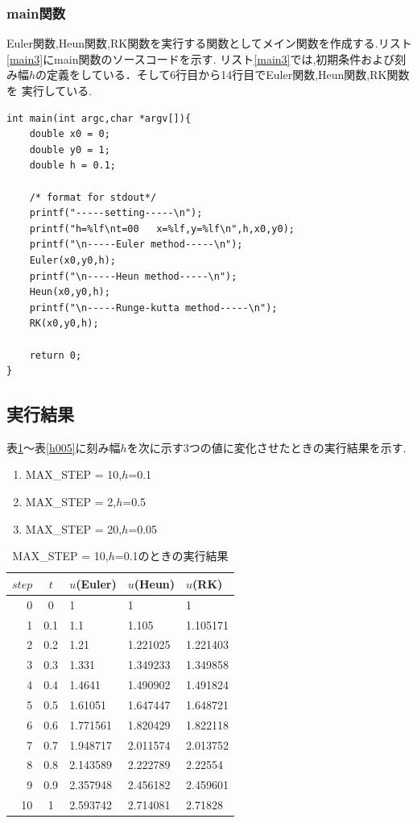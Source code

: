 \documentclass[dvipdfmx]{jarticle}
\begin{document}
      \subsubsection{main関数}
      Euler関数,Heun関数,RK関数を実行する関数としてメイン関数を作成する.リスト\ref{main3}にmain関数のソースコードを示す.
      リスト\ref{main3}では,初期条件および刻み幅$h$の定義をしている．そして6行目から14行目でEuler関数,Heun関数,RK関数を
      実行している.
      \begin{lstlisting}[basicstyle=\ttfamily\footnotesize, frame=single,label=main3,caption=main関数]
int main(int argc,char *argv[]){
    double x0 = 0;
    double y0 = 1;
    double h = 0.1;

    /* format for stdout*/
    printf("-----setting-----\n");
    printf("h=%lf\nt=00   x=%lf,y=%lf\n",h,x0,y0);
    printf("\n-----Euler method-----\n");
    Euler(x0,y0,h);
    printf("\n-----Heun method-----\n");
    Heun(x0,y0,h);
    printf("\n-----Runge-kutta method-----\n");
    RK(x0,y0,h);
    
    return 0;
}
            \end{lstlisting}      

    \subsection{実行結果}
    表\ref{h01}～表\ref{h005}に刻み幅$h$を次に示す3つの値に変化させたときの実行結果を示す.
    \begin{enumerate}
      \item MAX\_STEP = 10,$h$=0.1
      \item MAX\_STEP = 2,$h$=0.5
      \item MAX\_STEP = 20,$h$=0.05
    \end{enumerate}

    \begin{table}[H]
      \caption{MAX\_STEP = 10,$h$=0.1のときの実行結果}
    \label{h01}
    \begin{center}
        \begin{tabular}{r|c|l|l|l}\hline
          $step$ & $t$ & $u$(Euler) & $u$(Heun) & $u$(RK) \\ \hline \hline
0 & 0 & 1 & 1 & 1 \\ 
1 & 0.1 & 1.1 & 1.105 & 1.105171 \\ 
2 & 0.2 & 1.21 & 1.221025 & 1.221403 \\ 
3 & 0.3 & 1.331 & 1.349233 & 1.349858 \\ 
4 & 0.4 & 1.4641 & 1.490902 & 1.491824 \\ 
5 & 0.5 & 1.61051 & 1.647447 & 1.648721 \\ 
6 & 0.6 & 1.771561 & 1.820429 & 1.822118 \\ 
7 & 0.7 & 1.948717 & 2.011574 & 2.013752 \\ 
8 & 0.8 & 2.143589 & 2.222789 & 2.22554 \\ 
9 & 0.9 & 2.357948 & 2.456182 & 2.459601 \\ 
10 & 1 & 2.593742 & 2.714081 & 2.71828 \\ \hline
        \end{tabular}
    \end{center}
    \end{table}
\end{document}
